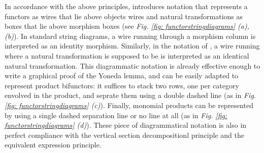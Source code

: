 \documentclass[11pt,a4paper,openright,twoside]{report}
\theoremstyle{plain}
\theoremstyle{definition}
\begin{document}
In accordance with the above principles, \cite{abbott2023robust} introduces notation that represents a functors as wires that lie above objects wires and natural transformations as boxes that lie above morphism boxes (see \textit{Fig. \ref{fig: functorstringdiagrams} (a), (b)}). In standard string diagrams, a wire running through a morphism column is interpreted as an identity morphism. Similarly, in the notation of \cite{abbott2023robust}, a wire running where a natural transformation is supposed to be is interpreted as an identical natural transformation. This diagrammatic notation is already effective enough to write a graphical proof of the Yoneda lemma, and can be easily adapted to represent product bifunctors: it suffices to stack two rows, one per category envolved in the product, and seprate them using a double dashed line (as in \textit{Fig. \ref{fig: functorstringdiagrams} (c)}). Finally, monomial products can be represented by using a single dashed separation line or no line at all (as in \textit{Fig. \ref{fig: functorstringdiagrams} (d)}). These piece of diagrammatical notation is also in perfect compliance with the vertical section decompositionl principle and the equivalent expression principle.
\end{document}
